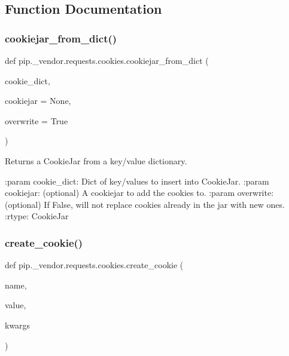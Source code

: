 \subsection{Function Documentation}
\mbox{\label{namespacepip_1_1__vendor_1_1requests_1_1cookies_abf7f7a7f3d49a7ebbf612ebfe497df33}} 
\subsubsection{\texorpdfstring{cookiejar\+\_\+from\+\_\+dict()}{cookiejar\_from\_dict()}}
{\footnotesize\ttfamily def pip.\+\_\+vendor.\+requests.\+cookies.\+cookiejar\+\_\+from\+\_\+dict (\begin{DoxyParamCaption}\item[{}]{cookie\+\_\+dict,  }\item[{}]{cookiejar = {\ttfamily None},  }\item[{}]{overwrite = {\ttfamily True} }\end{DoxyParamCaption})}

\begin{DoxyVerb}Returns a CookieJar from a key/value dictionary.

:param cookie_dict: Dict of key/values to insert into CookieJar.
:param cookiejar: (optional) A cookiejar to add the cookies to.
:param overwrite: (optional) If False, will not replace cookies
    already in the jar with new ones.
:rtype: CookieJar
\end{DoxyVerb}
 \mbox{\label{namespacepip_1_1__vendor_1_1requests_1_1cookies_ac97dc5eec2b7eb65c19f4b765074cc84}} 
\subsubsection{\texorpdfstring{create\+\_\+cookie()}{create\_cookie()}}
{\footnotesize\ttfamily def pip.\+\_\+vendor.\+requests.\+cookies.\+create\+\_\+cookie (\begin{DoxyParamCaption}\item[{}]{name,  }\item[{}]{value,  }\item[{}]{kwargs }\end{DoxyParamCaption})}

